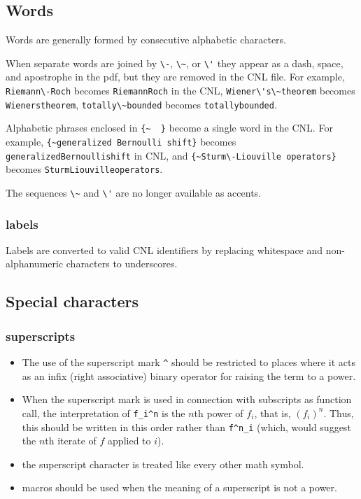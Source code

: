 \documentclass[12pt]{amsart}
\begin{document}
\subsection{Words}

Words are generally formed by consecutive alphabetic characters.

When separate words are joined by \verb!\-!, \verb!\~!, or \verb!\'! they appear
as a dash, space, and apostrophe in the pdf, 
but they are removed in the CNL file.
For example, 
\verb!Riemann\-Roch! becomes \verb!RiemannRoch! in the CNL,
\verb!Wiener\'s\~theorem! becomes \verb!Wienerstheorem!,
\verb!totally\~bounded! becomes \verb!totallybounded!.

Alphabetic phrases enclosed in \verb!{~  }! become a single word in the CNL.
For example,
\verb!{~generalized Bernoulli shift}! becomes \verb!generalizedBernoullishift! in 
CNL, and
\verb!{~Sturm\-Liouville operators}! becomes \verb!SturmLiouvilleoperators!.

The sequences \verb!\~! and \verb!\'! are no longer available as accents.

\subsubsection{labels}

Labels are converted to valid CNL identifiers by replacing
whitespace and non-alphanumeric characters to underscores.

\subsection{Special characters}

\subsubsection{superscripts}

\begin{itemize}
\item The use of the superscript mark \verb!^! should be restricted
to places where it acts as an infix (right associative) binary
operator for raising the term to a power.
\item When the superscript mark is used in connection with
subscripts as function call, the interpretation of \verb!f_i^n! is
the $n$th power of $f_i$, that is, $(f_i)^n$. 
Thus, this should be written in this
order rather than \verb!f^n_i! (which, would suggest the $n$th iterate
of $f$ applied to $i$).
\item the superscript character is treated like every other math symbol.
\item macros should be used when the meaning of a superscript is
not a power.
\end{itemize}
\end{document}

